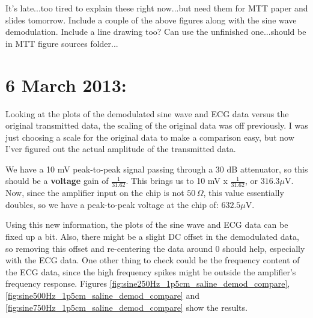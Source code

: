 \documentclass[12pt,onecolumn,titlepage]{article}
\begin{document}
It's late...too tired to explain these right now...but need them for MTT paper and slides tomorrow. Include a couple of the above figures along with the sine wave demodulation. Include a line drawing too? Can use the unfinished one...should be in MTT figure sources folder...



\clearpage
\section{6 March 2013:}

\indent \indent Looking at the plots of the demodulated sine wave and ECG data versus the original transmitted data, the scaling of the original data was off previously. I was just choosing a scale for the original data to make a comparison easy, but now I'ver figured out the actual amplitude of the transmitted data.

We have a 10 mV peak-to-peak signal passing through a 30 dB attenuator, so this should be a {\bf{voltage}} gain of $\frac{1}{31.62}$. This brings us to 10 mV x $\frac{1}{31.62}$, or $316.3 \mu$V. Now, since the amplifier input on the chip is not $50 \, \Omega$, this value essentially doubles, so we have a peak-to-peak voltage at the chip of: $632.5 \mu$V.

Using this new information, the plots of the sine wave and ECG data can be fixed up a bit. Also, there might be a slight DC offset in the demodulated data, so removing this offset and re-centering the data around 0 should help, especially with the ECG data. One other thing to check could be the frequency content of the ECG data, since the high frequency spikes might be outside the amplifier's frequency response. Figures \ref{fig:sine250Hz_1p5cm_saline_demod_compare}, \ref{fig:sine500Hz_1p5cm_saline_demod_compare} and \ref{fig:sine750Hz_1p5cm_saline_demod_compare} show the results. 
\end{document}
